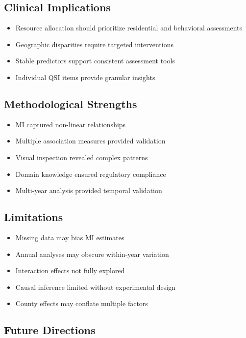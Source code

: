 \subsection{Clinical Implications}

\begin{itemize}
    \item Resource allocation should prioritize residential and behavioral assessments
    \item Geographic disparities require targeted interventions
    \item Stable predictors support consistent assessment tools
    \item Individual QSI items provide granular insights
\end{itemize}

\subsection{Methodological Strengths}

\begin{itemize}
    \item MI captured non-linear relationships
    \item Multiple association measures provided validation
    \item Visual inspection revealed complex patterns
    \item Domain knowledge ensured regulatory compliance
    \item Multi-year analysis provided temporal validation
\end{itemize}

\subsection{Limitations}

\begin{itemize}
    \item Missing data may bias MI estimates
    \item Annual analyses may obscure within-year variation
    \item Interaction effects not fully explored
    \item Causal inference limited without experimental design
    \item County effects may conflate multiple factors
\end{itemize}

\subsection{Future Directions}

